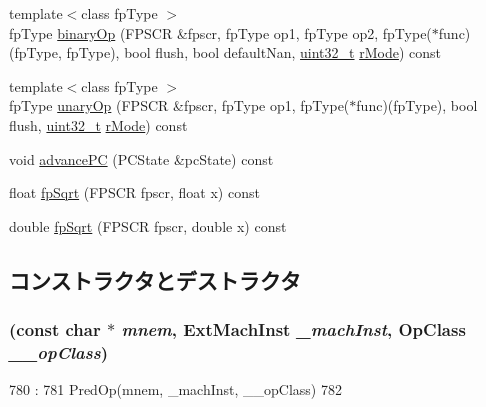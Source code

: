 \begin{DoxyCompactItemize}
\item 
{\footnotesize template$<$class fpType $>$ }\\fpType \hyperlink{classArmISA_1_1FpOp_acd464f48fab5cc85b99d2f45897149ba}{binaryOp} (FPSCR \&fpscr, fpType op1, fpType op2, fpType($\ast$func)(fpType, fpType), bool flush, bool defaultNan, \hyperlink{Type_8hh_a435d1572bf3f880d55459d9805097f62}{uint32\_\-t} \hyperlink{namespaceArmISA_a6a8214ac21eb2991c2975c0380f64b82}{rMode}) const 
\item 
{\footnotesize template$<$class fpType $>$ }\\fpType \hyperlink{classArmISA_1_1FpOp_a0129111f707a89446f721aafe6b11748}{unaryOp} (FPSCR \&fpscr, fpType op1, fpType($\ast$func)(fpType), bool flush, \hyperlink{Type_8hh_a435d1572bf3f880d55459d9805097f62}{uint32\_\-t} \hyperlink{namespaceArmISA_a6a8214ac21eb2991c2975c0380f64b82}{rMode}) const 
\item 
void \hyperlink{classArmISA_1_1FpOp_af04cd01429462d48e635f3e01ced6257}{advancePC} (PCState \&pcState) const 
\item 
float \hyperlink{classArmISA_1_1FpOp_a9a613f482c9fae6ba0296c19fe21a40d}{fpSqrt} (FPSCR fpscr, float x) const 
\item 
double \hyperlink{classArmISA_1_1FpOp_add67ed9b4396f7bde492ceaaf6af403d}{fpSqrt} (FPSCR fpscr, double x) const 
\end{DoxyCompactItemize}


\subsection{コンストラクタとデストラクタ}
\hypertarget{classArmISA_1_1FpOp_ad806871f6f7f01a9f4f4f4326f6d3f70}{
\subsubsection[{FpOp}]{ (const char $\ast$ {\em mnem}, \/  {\bf ExtMachInst} {\em \_\-machInst}, \/  OpClass {\em \_\-\_\-opClass})}}
\label{classArmISA_1_1FpOp_ad806871f6f7f01a9f4f4f4326f6d3f70}



\begin{DoxyCode}
780                                                                      :
781         PredOp(mnem, _machInst, __opClass)
782     {}

\end{DoxyCode}


